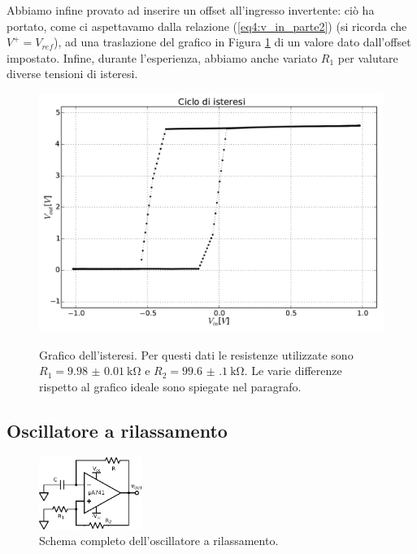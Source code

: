 Abbiamo infine provato ad inserire un offset all'ingresso invertente: ciò ha portato, come ci aspettavamo dalla relazione (\ref{eq4:v_in_parte2}) (si ricorda che $V^+=V_{ref}$), ad una traslazione del grafico in Figura \ref{gr4:isteresi} di un valore dato dall'offset impostato. Infine, durante l'esperienza, abbiamo anche variato $R_1$ per valutare diverse tensioni di isteresi.

\begin{figure}[ht]
 \centering
   {\includegraphics[width=14cm]{../E04/latex/XY.pdf}}
 \caption{Grafico dell'isteresi. Per questi dati le resistenze utilizzate sono $R_1=\SI{9.98(1)}{\kohm}$ e $R_2=\SI{99.6(1)}{\kohm}$. Le varie differenze rispetto al grafico ideale sono spiegate nel paragrafo.}
 \label{gr4:isteresi}
\end{figure}

\subsection{Oscillatore a rilassamento}

\begin{figure}
  \begin{center}
    \includegraphics[width=0.30\textwidth]{../E04/latex/c_rilassamento.pdf}
  \end{center}
  \caption{Schema completo dell'oscillatore a rilassamento.}
  \label{cir4:oscillatore}
\end{figure}

